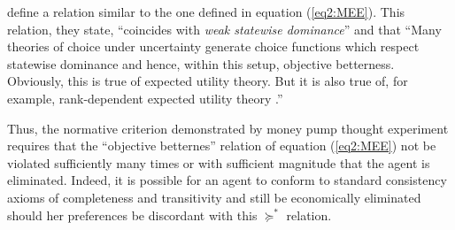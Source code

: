 \documentclass[../main.tex]{subfiles}
\begin{document}
\textcite[141]{Cubitt2001} define a relation similar to the one defined in equation (\ref{eq2:MEE}).
This relation, they state, \enquote{coincides with \textit{weak statewise dominance}} and that
\enquote{Many theories of choice under uncertainty generate choice functions which respect statewise dominance and hence, within this setup, objective betterness.
	Obviously, this is true of expected utility theory.
	But it is also true of, for example, \textcite{Quiggin1982} rank-dependent expected utility theory .}

Thus, the normative criterion demonstrated by money pump thought experiment requires that the \enquote{objective betternes} relation of equation (\ref{eq2:MEE}) not be violated sufficiently many times or with sufficient magnitude that the agent is eliminated.
Indeed, it is possible for an agent to conform to standard consistency axioms of completeness and transitivity and still be economically eliminated should her preferences be discordant with this $\succcurlyeq^*$ relation.{\footnotemark}


\addtocounter{footnote}{-1}
\end{document}
